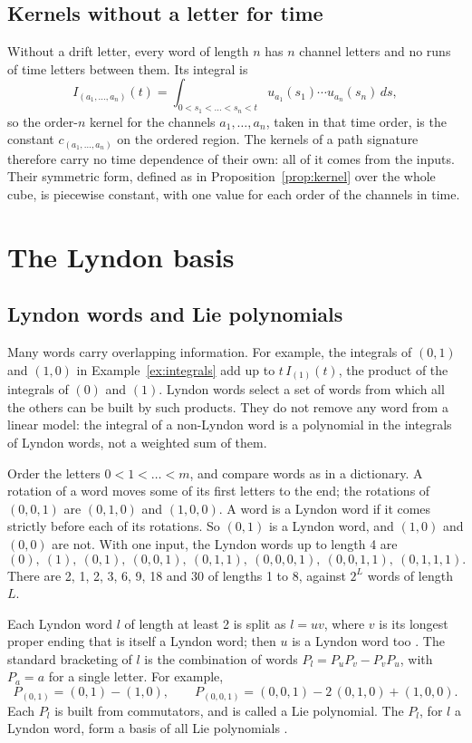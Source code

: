 \documentclass[11pt,a4paper]{article}
\theoremstyle{remark}
\begin{document}
\subsection{Kernels without a letter for time}
Without a drift letter, every word of length $n$ has $n$ channel letters and no runs of time letters between them.
Its integral is
\[I_{(a_1,\dots,a_n)}(t)=\int_{0<s_1<\dots<s_n<t}u_{a_1}(s_1)\cdots u_{a_n}(s_n)\,ds,\]
so the order-$n$ kernel for the channels $a_1,\dots,a_n$, taken in that time order, is the constant $c_{(a_1,\dots,a_n)}$ on the ordered region.
The kernels of a path signature therefore carry no time dependence of their own: all of it comes from the inputs.
Their symmetric form, defined as in Proposition~\ref{prop:kernel} over the whole cube, is piecewise constant, with one value for each order of the channels in time.

\section{The Lyndon basis}\label{sec:lyndon}
\subsection{Lyndon words and Lie polynomials}
Many words carry overlapping information.
For example, the integrals of $(0,1)$ and $(1,0)$ in Example~\ref{ex:integrals} add up to $t\,I_{(1)}(t)$, the product of the integrals of $(0)$ and $(1)$.
Lyndon words select a set of words from which all the others can be built by such products.
They do not remove any word from a linear model: the integral of a non-Lyndon word is a polynomial in the integrals of Lyndon words, not a weighted sum of them.

Order the letters $0<1<\dots<m$, and compare words as in a dictionary.
A rotation of a word moves some of its first letters to the end; the rotations of $(0,0,1)$ are $(0,1,0)$ and $(1,0,0)$.
A word is a Lyndon word if it comes strictly before each of its rotations.
So $(0,1)$ is a Lyndon word, and $(1,0)$ and $(0,0)$ are not.
With one input, the Lyndon words up to length 4 are
\[(0),\ (1),\ (0,1),\ (0,0,1),\ (0,1,1),\ (0,0,0,1),\ (0,0,1,1),\ (0,1,1,1).\]
There are 2, 1, 2, 3, 6, 9, 18 and 30 of lengths 1 to 8, against $2^L$ words of length $L$.

Each Lyndon word $l$ of length at least 2 is split as $l=uv$, where $v$ is its longest proper ending that is itself a Lyndon word; then $u$ is a Lyndon word too \cite{ChenFoxLyndon1958}.
The standard bracketing of $l$ is the combination of words $P_l=P_uP_v-P_vP_u$, with $P_a=a$ for a single letter.
For example,
\[P_{(0,1)}=(0,1)-(1,0),\qquad P_{(0,0,1)}=(0,0,1)-2\,(0,1,0)+(1,0,0).\]
Each $P_l$ is built from commutators, and is called a Lie polynomial.
The $P_l$, for $l$ a Lyndon word, form a basis of all Lie polynomials \cite{Reutenauer1993}.
\end{document}
